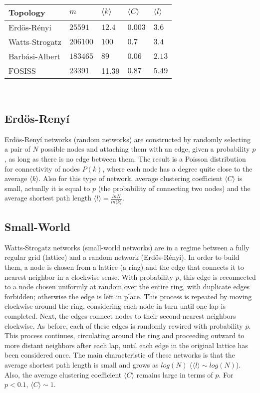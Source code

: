 \documentclass{bmcart}
\begin{document}
\begin{tabular}{| l |  l | l |l|l|}
\hline
\bf{Topology}       & $m$              & $\langle k \rangle$          & $\langle C \rangle$      & $\langle l \rangle$ \\ \hline
Erd\"{o}s-R\'enyi  &  $25591$      &  $12.4$        &  $0.003$ & $3.6$  \\ \hline
Watts-Strogatz    &  $206100$   &  $100$         &  $0.7$      & $3.4$  \\ \hline
Barb\'asi-Albert    &  $183465$   &  $89$           &  $0.06$    & $2.13$ \\ \hline
FOSISS                    &  $23391$     &   11.39     &  $0.87$    &  $5.49$ \\ \hline
\end{tabular}\\ 


\subsection*{Erd\"{o}s-Reny\'i}

Erd\"{o}s-Reny\'i networks \cite{ErdosRenyi:59} (random networks) are constructed by randomly selecting a pair of $N$ possible nodes and attaching them with an edge, given a probability $p$, as long as there is no edge between them. The result is a Poisson distribution for connectivity of nodes $P(k)$, where each node has a degree quite close to the average $\langle k \rangle$. Also for this type of network, average clustering coefficient  $\langle C \rangle$ is small, actually it is equal to $p$ (the probability of connecting two nodes) and the average shortest path length $\langle l \rangle = \frac{lnN}{ln\langle k \rangle}$.


\subsection*{Small-World}

Watts-Strogatz networks \cite{WattsStrogatz:98} (small-world networks) are in a regime between a fully regular grid (lattice) and a random network (Erd\"{o}s-R\'enyi). In order to build them, a node is chosen from a lattice (a ring) and the edge that connects it to nearest neighbor in a clockwise sense. With probability $p$, this edge is reconnected to a node chosen uniformly at random over the entire ring, with duplicate edges forbidden; otherwise the edge is left in place. This process is repeated by moving clockwise around the ring, considering each node in turn until one lap is completed. Next, the edges connect nodes to their second-nearest neighbors clockwise. As before, each of these edges is randomly rewired with probability $p$. This process continues, circulating around the ring and proceeding outward to more distant neighbors after each lap, until each edge in the original lattice has been considered once. The main characteristic of these networks is that the average shortest path length is small and grows as $log(N)$ ($\langle l \rangle \sim log(N)$). Also, the average clustering coefficient $\langle C \rangle$ remains large in terms of $p$. For $p < 0.1$, $\langle C \rangle \sim 1$.
\end{document}
